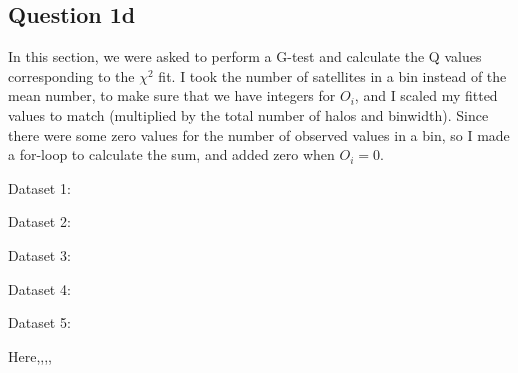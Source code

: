 \subsection{Question 1d}

In this section, we were asked to perform a G-test and calculate the Q values corresponding to the $\chi^2$ fit. 
I took the number of satellites in a bin instead of the mean number, to make sure that we have integers for $O_i$, and I scaled my fitted values to match (multiplied by the total number of halos and binwidth).
Since there were some zero values for the number of observed values in a bin, so I made a for-loop to calculate the sum, and added zero when $O_i = 0$.

Dataset 1:

Dataset 2:

Dataset 3:

Dataset 4:

Dataset 5:


Here,,,,

